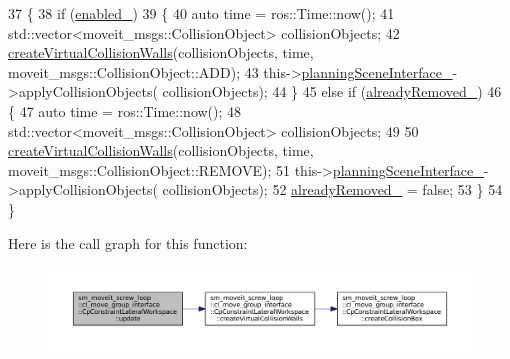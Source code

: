 \begin{DoxyCode}
37         \{
38             \textcolor{keywordflow}{if} (\hyperlink{classsm__moveit__screw__loop_1_1cl__move__group__interface_1_1CpConstraintLateralWorkspace_a4f987ccb3af2696d5a543aacaa8e8855}{enabled\_})
39             \{
40                 \textcolor{keyword}{auto} time = ros::Time::now();
41                 std::vector<moveit\_msgs::CollisionObject> collisionObjects;
42                 \hyperlink{classsm__moveit__screw__loop_1_1cl__move__group__interface_1_1CpConstraintLateralWorkspace_a0eab8923125db7d219b12ca0716f3fe4}{createVirtualCollisionWalls}(collisionObjects, time, 
      moveit\_msgs::CollisionObject::ADD);
43                 this->\hyperlink{classsm__moveit__screw__loop_1_1cl__move__group__interface_1_1CpConstraintLateralWorkspace_a0ff91498e2b0b4287c45d9a96ed8c237}{planningSceneInterface\_}->applyCollisionObjects(
      collisionObjects);
44             \}
45             \textcolor{keywordflow}{else} \textcolor{keywordflow}{if} (\hyperlink{classsm__moveit__screw__loop_1_1cl__move__group__interface_1_1CpConstraintLateralWorkspace_a95804f1aec34e8471a8c507e5e4af06c}{alreadyRemoved\_})
46             \{
47                 \textcolor{keyword}{auto} time = ros::Time::now();
48                 std::vector<moveit\_msgs::CollisionObject> collisionObjects;
49 
50                 \hyperlink{classsm__moveit__screw__loop_1_1cl__move__group__interface_1_1CpConstraintLateralWorkspace_a0eab8923125db7d219b12ca0716f3fe4}{createVirtualCollisionWalls}(collisionObjects, time, 
      moveit\_msgs::CollisionObject::REMOVE);
51                 this->\hyperlink{classsm__moveit__screw__loop_1_1cl__move__group__interface_1_1CpConstraintLateralWorkspace_a0ff91498e2b0b4287c45d9a96ed8c237}{planningSceneInterface\_}->applyCollisionObjects(
      collisionObjects);
52                 \hyperlink{classsm__moveit__screw__loop_1_1cl__move__group__interface_1_1CpConstraintLateralWorkspace_a95804f1aec34e8471a8c507e5e4af06c}{alreadyRemoved\_} = \textcolor{keyword}{false};
53             \}
54         \}
\end{DoxyCode}
Here is the call graph for this function\+:
\nopagebreak
\begin{figure}[H]
\begin{center}
\leavevmode
\includegraphics[width=350pt]{classsm__moveit__screw__loop_1_1cl__move__group__interface_1_1CpConstraintLateralWorkspace_a2c742726dc5d521fba7a357dc4ec3dac_cgraph}
\end{center}
\end{figure}
